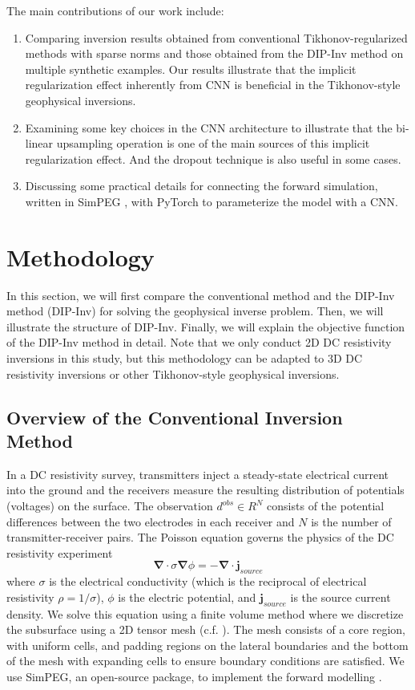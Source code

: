 \documentclass[lettersize,journal]{IEEEtran}
\begin{document}
The main contributions of our work include: 
\begin{enumerate}
\item{Comparing inversion results obtained from conventional Tikhonov-regularized methods with sparse norms and those obtained from the DIP-Inv method on multiple synthetic examples. Our results illustrate that the implicit regularization effect inherently from CNN is beneficial in the Tikhonov-style geophysical inversions.}
\item{Examining some key choices in the CNN architecture to illustrate that the bi-linear upsampling operation is one of the main sources of this implicit regularization effect. And the dropout technique is also useful in some cases.}
\item{Discussing some practical details for connecting the forward simulation, written in SimPEG \cite{ref3}, with PyTorch \cite{ref24} to parameterize the model with a CNN.}
\end{enumerate}

\section{Methodology}
\label{sec:2}
In this section, we will first compare the conventional method and the DIP-Inv method (DIP-Inv) for solving the geophysical inverse problem. Then, we will illustrate the structure of DIP-Inv. Finally, we will explain the objective function of the DIP-Inv method in detail. Note that we only conduct 2D DC resistivity inversions in this study, but this methodology can be adapted to 3D DC resistivity inversions or other Tikhonov-style geophysical inversions. 

\subsection{Overview of the Conventional Inversion Method}
In a DC resistivity survey, transmitters inject a steady-state electrical current into the ground and the receivers measure the resulting distribution of potentials (voltages) on the surface. The observation $d^{obs} \in R^N$ consists of the potential differences between the two electrodes in each receiver and $N$ is the number of transmitter-receiver pairs. 
The Poisson equation governs the physics of the DC resistivity experiment
\begin{equation}
\label{Poisson equation}
\boldsymbol{\nabla} \cdot \sigma\boldsymbol{\nabla}\phi = -\boldsymbol{\nabla}\cdot\mathbf{j}_{source}
\end{equation}
where $\sigma$ is the electrical conductivity (which is the reciprocal of electrical resistivity $\rho=1/\sigma$), $\phi$ is the electric potential, and $\mathbf{j}_{source}$ is the source current density. We solve this equation using a finite volume method where we discretize the subsurface using a 2D tensor mesh (c.f. \cite{ref19}). The mesh consists of a core region, with uniform cells, and padding regions on the lateral boundaries and the bottom of the mesh with expanding cells to ensure boundary conditions are satisfied.  
We use SimPEG, an open-source package, to implement the forward modelling \cite{ref3}. 
\end{document}

